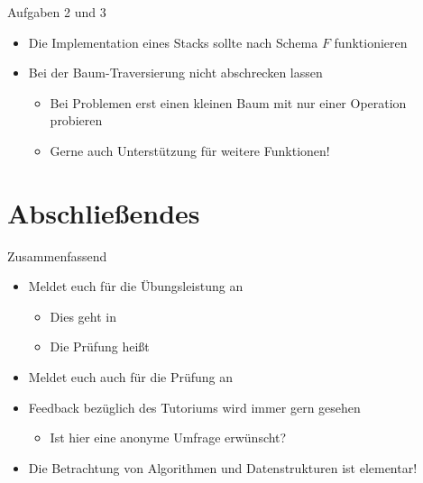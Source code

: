\begin{frame}{Aufgaben 2 und 3}
    \begin{itemize}
        \itemsep12pt
        \item Die Implementation eines Stacks sollte nach Schema \(F\) funktionieren
        \item Bei der Baum-Traversierung nicht abschrecken lassen \begin{itemize}
            \item Bei Problemen erst einen kleinen Baum mit nur einer Operation probieren
            \item Gerne auch Unterstützung für weitere Funktionen!
        \end{itemize}
    \end{itemize}
\end{frame}
\fi

\section{Abschließendes}

{\SummaryFrame
\begin{frame}[fragile,t]{Zusammenfassend}
{}
\vfill\vfill %
\begin{itemize}[<+(1)->]
    \itemsep8pt
    \item Meldet euch für die Übungsleistung an \begin{itemize}
        \item Dies geht in 
        \item Die Prüfung heißt 
    \end{itemize}
    \item Meldet euch auch für die Prüfung an
    \item Feedback bezüglich des Tutoriums wird immer gern gesehen \begin{itemize}
        \item Ist hier eine anonyme Umfrage erwünscht?
    \end{itemize}
    \item Die Betrachtung von Algorithmen und Datenstrukturen ist elementar!
\end{itemize}
\end{frame}
}



\iffull\fi
